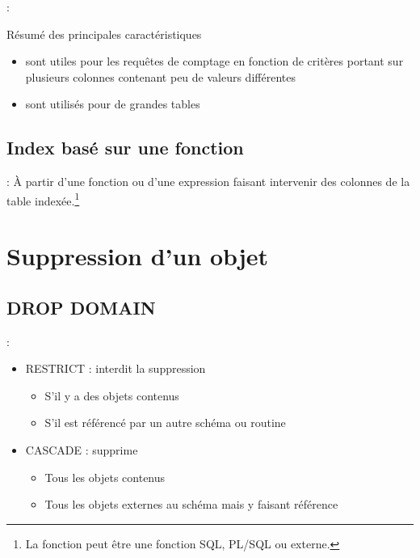 \documentclass[10pt]{beamer}
\begin{document}
\begin{frame}{\secname : \subsecname}
    \begin{alertblock}{Résumé des principales caractéristiques}
        \begin{itemize}
            \item sont utiles pour les requêtes de comptage en fonction de critères portant sur plusieurs colonnes contenant peu de valeurs différentes
            \item sont utilisés pour de grandes tables
        \end{itemize}
    \end{alertblock}
\end{frame}

\subsection{Index basé sur une fonction}
\begin{frame}{\secname : \subsecname}
    À partir d'une fonction ou d'une expression faisant intervenir des colonnes de la table indexée.\footnote{La fonction peut être une fonction SQL, PL/SQL ou externe.}
    
\end{frame}

\section{Suppression d’un objet}
\tocss
\subsection{DROP DOMAIN}
\begin{frame}{\secname : \subsecname}
    
    \begin{itemize}
        \item RESTRICT : interdit la suppression
              \begin{itemize}
                  \item S'il y a des objets contenus
                  \item S'il est référencé par un autre schéma ou routine
              \end{itemize}
        \item CASCADE : supprime
              \begin{itemize}
                  \item Tous les objets contenus
                  \item Tous les objets externes au schéma mais y faisant référence
              \end{itemize}
    \end{itemize}
\end{frame}
\end{document}
